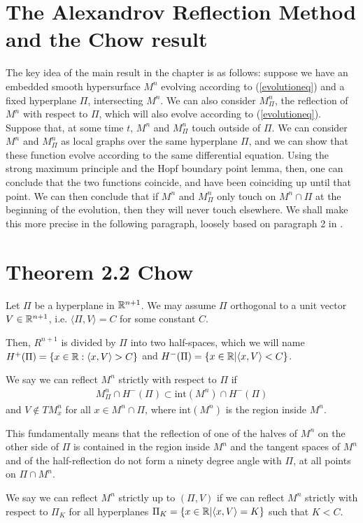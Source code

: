 \section{The Alexandrov Reflection Method and the Chow result}


The key idea of the main result in the chapter is as follows: suppose we have an embedded smooth hypersurface $M^n$ evolving according to (\ref{evolutioneq}) and a fixed hyperplane $\Pi$, intersecting $M^n$. We can also consider $M^n_\Pi$, the reflection of $M^n$ with respect to $\Pi$, which will also evolve according to (\ref{evolutioneq}). Suppose that, at some time $t$, $M^n$ and  $M^n_\Pi$ touch outside of $\Pi$. We can consider $M^n$ and  $M^n_\Pi$ as local graphs over the same hyperplane $\Pi$, and we can show that these function evolve according to the same differential equation. Using the strong maximum principle and the Hopf boundary point lemma, then, one can conclude that the two functions coincide, and have been coinciding up until that point. We can then conclude that if  $M^n$ and  $M^n_\Pi$ only touch on $M^n\cap\Pi$ at the beginning of the evolution, then they will never touch elsewhere. We shall make this more precise in the following paragraph, loosely based on paragraph 2 in \cite{Chow}. 

\section{Theorem 2.2 Chow}



Let $\Pi$ be a hyperplane in $\mathbb{R}^{n+1}$. We may assume $\Pi$ orthogonal to a unit vector $V\in\mathbb{R}^{n+1}$, i.e. $\langle\Pi, V\rangle= C$ for some constant $C$. 

Then, $R^{n+1}$ is divided by $\Pi$ into two half-spaces, which we will name  $H^+(\Pi)=\{x \in \mathbb{R} : \langle x, V\rangle > C\}$ and  $H^-(\Pi)=\{x \in \mathbb{R} | \langle x, V\rangle < C\}$. 

\begin{defin}
	We say we can reflect $M^n$ strictly with respect to $\Pi$ if 
	\begin{align*}
		M^n_\Pi\cap H^-(\Pi)\subset \mathrm{int}(M^n)\cap H^-(\Pi)
	\end{align*} 
	and $V\notin TM^n_x$ for all $x\in M^n \cap\Pi$, where $\mathrm{int}(M^n)$ is the region inside $M^n$. 
\end{defin}
This fundamentally means that the reflection of one of the halves of $M^n$ on the other side of $\Pi$ is contained in the region inside $M^n$ and the tangent spaces of $M^n$ and of the half-reflection do not form a ninety degree angle with $\Pi$, at all points on $\Pi\cap M^n$. 
\begin{defin}
	We say we can reflect $M^n$ strictly up to $(\Pi,V)$ if we can reflect $M^n$ strictly with respect to $\Pi_K$ for all hyperplanes $\Pi_K=\{x \in \mathbb{R} | \langle x, V\rangle = K\}$ such that $K<C$.  
\end{defin}

